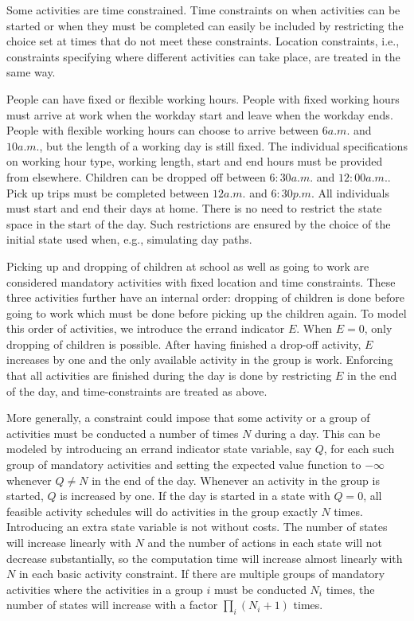 Some activities are time constrained. Time constraints on when activities can be started or when they must be completed can easily be included by restricting the choice set at times that do not meet these constraints. Location constraints, i.e., constraints specifying where different activities can take place, are treated in the same way.

People can have fixed or flexible working hours. People with fixed working hours must arrive at work when the workday start and leave when the workday ends. %
People with flexible working hours can choose to arrive between $6\unit{a.m.}$ and $10\unit{a.m.}$, but the length of a working day is still fixed. The individual specifications on working hour type, working length, start and end hours must be provided from elsewhere. Children can be dropped off between $6:30\unit{a.m.}$ and $12:00\unit{a.m.}$. Pick up trips must be completed between $12\unit{a.m.}$ and $6:30\unit{p.m.}$
All individuals must start and end their days at home. There is no need to restrict the state space in the start of the day. Such restrictions are ensured by the choice of the initial state used when, e.g., simulating day paths.


Picking up and dropping of children at school as well as going to work are considered mandatory activities with fixed location and time constraints. These three activities further have an internal order: dropping of children is done before going to work which must be done before picking up the children again. To model this order of activities, we introduce the errand indicator $E$. When $E=0$, only dropping of children is possible. After having finished a drop-off activity, $E$ increases by one and the only available activity in the group is work. Enforcing that all activities are finished during the day is done by restricting $E$ in the end of the day, and time-constraints are treated as above.

More generally, a constraint could impose that some activity or a group of activities must be conducted a number of times $N$ during a day. This can be modeled by introducing an errand indicator state variable, say $Q$, for each such group of mandatory activities and setting the expected value function to $-\infty$ whenever $Q\neq N$ in the end of the day. Whenever an activity in the group is started, $Q$ is increased by one. If the day is started in a state with $Q=0$, all feasible activity schedules will do activities in the group exactly $N$ times. Introducing an extra state variable is not without costs. The number of states will increase linearly with $N$ and the number of actions in each state will not decrease substantially, so the computation time will increase almost linearly with $N$ in each basic activity constraint. If there are multiple groups of mandatory activities where the activities in a group $i$ must be conducted $N_i$ times, the number of states will increase with a factor $\prod_i (N_i+1)$ times. 


